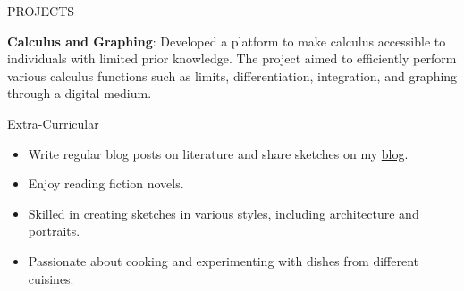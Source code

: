 \documentclass{resume} %
\begin{document}

\begin{rSection}{PROJECTS}

\item \textbf{Calculus and Graphing}: {Developed a platform to make calculus accessible to individuals with limited prior knowledge. The project aimed to efficiently perform various calculus functions such as limits, differentiation, integration, and graphing through a digital medium.}

\end{rSection} 

\begin{rSection}{Extra-Curricular} 
\begin{itemize}

\item Write regular blog posts on literature and share sketches on my \href{https://porush.me}{blog}.
\item Enjoy reading fiction novels.
\item Skilled in creating sketches in various styles, including architecture and portraits.
\item Passionate about cooking and experimenting with dishes from different cuisines.

\end{itemize}
\end{rSection}

\end{document}
